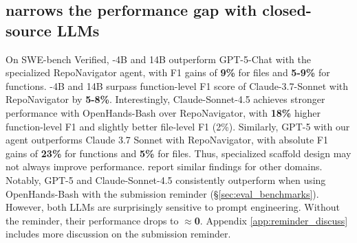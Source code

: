 \subsection{\methodname narrows the performance gap with closed-source LLMs}\label{sec:closed_source_results}
On SWE-bench Verified, \methodname-4B and 14B outperform GPT-5-Chat with the specialized RepoNavigator agent, with F1 gains of \textbf{9\%} for files and \textbf{5-9\%} for functions. \methodname-4B and 14B surpass function-level F1 score of Claude-3.7-Sonnet with RepoNavigator by \textbf{5-8\%}. 
Interestingly, Claude-Sonnet-4.5 achieves stronger performance with OpenHands-Bash over RepoNavigator, with \textbf{18\%} higher function-level F1 and slightly better file-level F1 (2\%). Similarly, GPT-5 with our agent outperforms Claude 3.7 Sonnet with RepoNavigator, with absolute F1 gains of \textbf{23\%} for functions and \textbf{5\%} for files. Thus, specialized scaffold design may not always improve performance. \citet{soni2025codingagentsmultimodalbrowsing, mini_swe_agent_repo} report similar findings for other domains. Notably, GPT-5 and Claude-Sonnet-4.5 consistently outperform \methodname when using  OpenHands-Bash with the submission reminder (\S\ref{sec:eval_benchmarks}). However, both LLMs are surprisingly sensitive to prompt engineering. Without the reminder, their performance drops to $\approx$\textbf{0}. Appendix \ref{app:reminder_discuss} includes  more discussion on the submission reminder.



